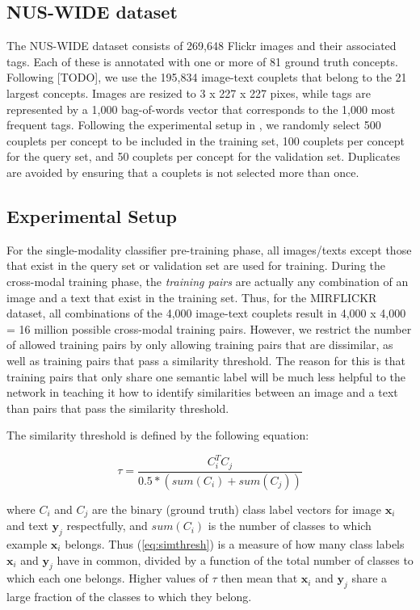 \documentclass[letterpaper]{article}
\newcommand{\xii}{\mathbf{x}_i}
\newcommand{\yj}{\mathbf{y}_j}
\begin{document}
\subsection{NUS-WIDE dataset}

The NUS-WIDE dataset \cite{nuswide} consists of 269,648 Flickr images and their associated tags. Each of these is annotated with one or more of 81 ground truth concepts. Following [TODO], we use the 195,834 image-text couplets that belong to the 21 largest concepts. Images are resized to 3 x 227 x 227 pixes, while tags are represented by a 1,000 bag-of-words vector that corresponds to the 1,000 most frequent tags. Following the experimental setup in \cite{cdq,chn}, we randomly select 500 couplets per concept to be included in the training set, 100 couplets per concept for the query set, and 50 couplets per concept for the validation set. Duplicates are avoided by ensuring that a couplets is not selected more than once. 

\subsection{Experimental Setup}

For the single-modality classifier pre-training phase, all images/texts except those that exist in the query set or validation set are used for training. During the cross-modal training phase, the \emph{training pairs} are actually any combination of an image and a text that exist in the training set. Thus, for the MIRFLICKR dataset, all combinations of the 4,000 image-text couplets result in 4,000 x 4,000 = 16 million possible cross-modal training pairs. However, we restrict the number of allowed training pairs by only allowing training pairs that are dissimilar, as well as training pairs that pass a similarity threshold. The reason for this is that training pairs that only share one semantic label will be much less helpful to the network in teaching it how to identify similarities between an image and a text than pairs that pass the similarity threshold.

The similarity threshold is defined by the following equation:

\begin{equation}
\label{eq:simthresh}
\tau = \frac{C_i^T C_j}{0.5 * (sum(C_i) + sum(C_j)) }
\end{equation}

where $ C_i $ and $ C_j $ are the binary (ground truth) class label vectors for image $ \xii $ and text $ \yj $ respectfully, and $ sum(C_i) $ is the number of classes to which example $ \xii $ belongs. Thus (\ref{eq:simthresh}) is a measure of how many class labels $ \xii $ and $ \yj $ have in common, divided by a function of the total number of classes to which each one belongs. Higher values of $ \tau $ then mean that $ \xii $ and $ \yj $ share a large fraction of the classes to which they belong.
\end{document}
